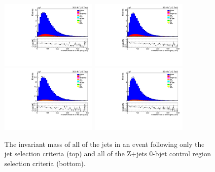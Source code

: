 \begin{figure}[ht]
\centering
\includegraphics[width=0.42\textwidth]{figs/background-estimation/plots/unblinded/DY_control_old_prompt_ee_DYamcatnlo/totalJetMass_SingleTop_jetSel_ee.pdf}
\includegraphics[width=0.42\textwidth]{figs/background-estimation/plots/unblinded/DY_control_old_prompt_mumu_DYamcatnlo/totalJetMass_SingleTop_jetSel_mumu.pdf}
\\
\includegraphics[width=0.42\textwidth]{figs/background-estimation/plots/unblinded/DY_control_old_prompt_ee_DYamcatnlo/totalJetMass_SingleTop_wMass_ee.pdf}
\includegraphics[width=0.42\textwidth]{figs/background-estimation/plots/unblinded/DY_control_old_prompt_mumu_DYamcatnlo/totalJetMass_SingleTop_wMass_mumu.pdf}
\caption{
The invariant mass of all of the jets in an event following only the jet selection criteria (top) and all of the Z+jets 0-bjet control region selection criteria (bottom).
}
\label{fig:App_CR_NLO_totalJetMass}
\end{figure}

